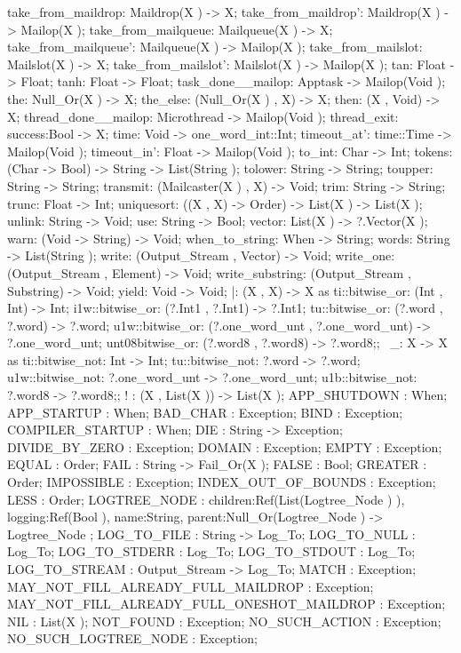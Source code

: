 take_from_maildrop: Maildrop(X ) -> X;
take_from_maildrop': Maildrop(X ) -> Mailop(X );
take_from_mailqueue: Mailqueue(X ) -> X;
take_from_mailqueue': Mailqueue(X ) -> Mailop(X );
take_from_mailslot: Mailslot(X ) -> X;
take_from_mailslot': Mailslot(X ) -> Mailop(X );
tan: Float -> Float;
tanh: Float -> Float;
task_done__mailop: Apptask -> Mailop(Void );
the: Null_Or(X ) -> X;
the_else: (Null_Or(X ) , X) -> X;
then: (X , Void) -> X;
thread_done__mailop: Microthread -> Mailop(Void );
thread_exit: {success:Bool} -> X;
time: Void -> one_word_int::Int;
timeout_at': time::Time -> Mailop(Void );
timeout_in': Float -> Mailop(Void );
to_int: Char -> Int;
tokens: (Char -> Bool) -> String -> List(String );
tolower: String -> String;
toupper: String -> String;
transmit: (Mailcaster(X ) , X) -> Void;
trim: String -> String;
trunc: Float -> Int;
uniquesort: ((X , X) -> Order) -> List(X ) -> List(X );
unlink: String -> Void;
use: String -> Bool;
vector: List(X ) -> ?.Vector(X );
warn: (Void -> String) -> Void;
when_to_string: When -> String;
words: String -> List(String );
write: (Output_Stream , Vector) -> Void;
write_one: (Output_Stream , Element) -> Void;
write_substring: (Output_Stream , Substring) -> Void;
yield: Void -> Void;
|:
(X , X) -> X
as  ti::bitwise_or: (Int , Int) -> Int;
    i1w::bitwise_or: (?.Int1 , ?.Int1) -> ?.Int1;
    tu::bitwise_or: (?.word , ?.word) -> ?.word;
    u1w::bitwise_or: (?.one_word_unt , ?.one_word_unt) -> ?.one_word_unt;
    unt08bitwise_or: (?.word8 , ?.word8) -> ?.word8;;
~_:
X -> X
as  ti::bitwise_not: Int -> Int;
    tu::bitwise_not: ?.word -> ?.word;
    u1w::bitwise_not: ?.one_word_unt -> ?.one_word_unt;
    u1b::bitwise_not: ?.word8 -> ?.word8;;
! : (X , List(X )) -> List(X );
APP_SHUTDOWN : When;
APP_STARTUP : When;
BAD_CHAR : Exception;
BIND : Exception;
COMPILER_STARTUP : When;
DIE : String -> Exception;
DIVIDE_BY_ZERO : Exception;
DOMAIN : Exception;
EMPTY : Exception;
EQUAL : Order;
FAIL : String -> Fail_Or(X );
FALSE : Bool;
GREATER : Order;
IMPOSSIBLE : Exception;
INDEX_OUT_OF_BOUNDS : Exception;
LESS : Order;
    LOGTREE_NODE
    :   {children:Ref(List(Logtree_Node ) ), logging:Ref(Bool ), name:String, parent:Null_Or(Logtree_Node )}
        ->
        Logtree_Node
;
LOG_TO_FILE : String -> Log_To;
LOG_TO_NULL : Log_To;
LOG_TO_STDERR : Log_To;
LOG_TO_STDOUT : Log_To;
LOG_TO_STREAM : Output_Stream -> Log_To;
MATCH : Exception;
MAY_NOT_FILL_ALREADY_FULL_MAILDROP : Exception;
MAY_NOT_FILL_ALREADY_FULL_ONESHOT_MAILDROP : Exception;
NIL : List(X );
NOT_FOUND : Exception;
NO_SUCH_ACTION : Exception;
NO_SUCH_LOGTREE_NODE : Exception;
